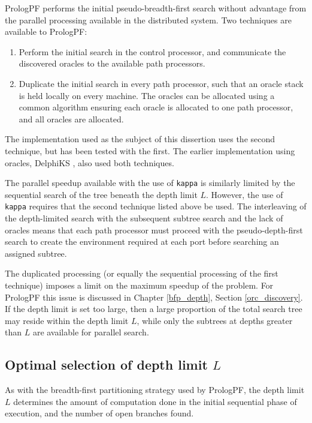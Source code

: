 PrologPF performs the initial pseudo-breadth-first search without advantage from
the parallel processing available in the distributed system.  Two techniques are
available to PrologPF:
\begin{enumerate}
\item{Perform the initial search in the control processor, and communicate the
  discovered oracles to the available path processors.}
\item{Duplicate the initial search in every path processor, such that an oracle
  stack is held locally on every machine.  The oracles can be allocated using a
  common algorithm ensuring each oracle is allocated to one path processor, and
  all oracles are allocated.}
\end{enumerate}
The implementation used as the subject of this dissertion uses the second
technique, but has been tested with the first.  The earlier implementation
using oracles, DelphiKS \cite{Kle91, Sar95}, also used both techniques.

The parallel speedup available with the use of \texttt{kappa} is similarly
limited by the sequential search of the tree beneath the depth limit $L$.
However, the use of \texttt{kappa} requires that the second technique listed
above be used.  The interleaving of the depth-limited search with the 
subsequent subtree search and the lack of oracles means that each path processor
must proceed with the pseudo-depth-first search to create the environment
required at each port before searching an assigned subtree.

The duplicated processing (or equally the sequential processing of the first
technique) imposes a limit on the maximum speedup of the problem.  For PrologPF
this issue is discussed in Chapter \ref{bfp_depth}, Section \ref{orc_discovery}.
If the depth limit is set too large, then a large proportion of the total
search tree may reside within the depth limit $L$, while only the subtrees
at depths greater than $L$ are available for parallel search.

\subsection{Optimal selection of depth limit $L$}

As with the breadth-first partitioning strategy used by PrologPF, the depth
limit $L$ determines the amount of computation done in the initial sequential
phase of execution, and the number of open branches found.

